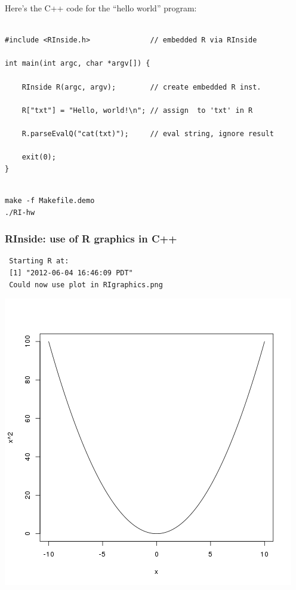 \documentclass[11pt]{article}
\begin{document}
Here's the C++ code for the ``hello world'' program:


\begin{verbatim}

#include <RInside.h>              // embedded R via RInside

int main(int argc, char *argv[]) {

    RInside R(argc, argv);        // create embedded R inst.

    R["txt"] = "Hello, world!\n"; // assign  to 'txt' in R

    R.parseEvalQ("cat(txt)");     // eval string, ignore result

    exit(0);
}
\end{verbatim}


\begin{verbatim}

make -f Makefile.demo
./RI-hw
\end{verbatim}
\subsubsection{RInside: use of R graphics in C++}
\label{sec-3-2-2}






\begin{verbatim}
 Starting R at:
 [1] "2012-06-04 16:46:09 PDT"
 Could now use plot in RIgraphics.png
\end{verbatim}


\includegraphics[width=.9\linewidth]{./RIgraphics.png}
\end{document}
